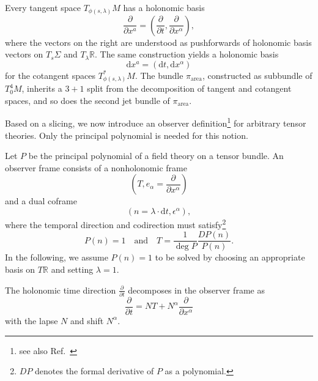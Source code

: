 Every tangent space $T_{\phi(s,\lambda)}M$ has a holonomic basis
\begin{equation}
  \frac{\partial}{\partial x^a} = \left( \frac{\partial}{\partial t},\frac{\partial}{\partial x^\alpha}\right),
\end{equation}
where the vectors on the right are understood as pushforwards of holonomic basis vectors on $T_s\Sigma$ and $T_\lambda\mathbb R$. The same construction yields a holonomic basis
\begin{equation}
  \mathrm dx^a = (\mathrm dt, \mathrm dx^\alpha)
\end{equation}
for the cotangent spaces $T_{\phi(s,\lambda)}^\ast M$. The bundle $\pi_\text{area}$, constructed as subbundle of $T^4_0M$, inherits a $3+1$ split from the decomposition of tangent and cotangent spaces, and so does the second jet bundle of $\pi_\text{area}$.

Based on a slicing, we now introduce an observer definition\footnote{see also Ref.\ \cite{Giesel_2012}} for arbitrary tensor theories. Only the principal polynomial is needed for this notion.
\begin{definition}
  Let $P$ be the principal polynomial of a field theory on a tensor bundle. An observer frame consists of a nonholonomic frame
  \begin{equation}
    (T, e_\alpha = \frac{\partial}{\partial x^\alpha})
  \end{equation}
  and a dual coframe
  \begin{equation}
    (n = \lambda\cdot \mathrm dt, \epsilon^{\alpha}),
  \end{equation}
  where the temporal direction and codirection must satisfy\footnote{$DP$ denotes the formal derivative of $P$ as a polynomial.}
  \begin{equation}\label{frame_conditions}
    P(n) = 1\quad\text{and}\quad T=\frac{1}{\operatorname{deg}P}\frac{DP(n)}{P(n)}.
  \end{equation}
  In the following, we assume $P(n) = 1$ to be solved by choosing an appropriate basis on $T\mathbb R$ and setting $\lambda = 1$.

  The holonomic time direction $\frac{\partial}{\partial t}$ decomposes in the observer frame as
  \begin{equation}
    \frac{\partial}{\partial t} = NT + N^\alpha \frac{\partial}{\partial x^\alpha}
  \end{equation}
  with the lapse $N$ and shift $N^\alpha$.
\end{definition}

